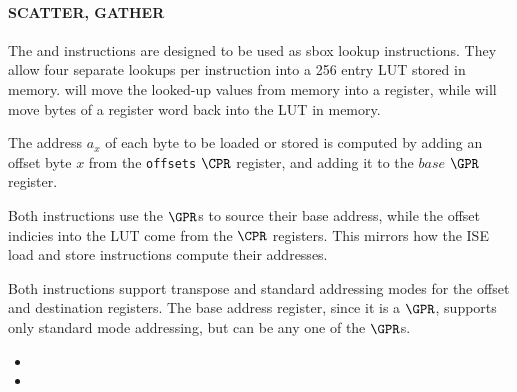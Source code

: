 
\paragraph{SCATTER, GATHER}

The  and  instructions are designed to be used as
sbox lookup instructions. They allow four separate lookups per instruction
into a 256 entry LUT stored in memory.  will move the looked-up
values from memory into a register, while  will move bytes of a
register word back into the LUT in memory.

The address $a_x$ of each byte to be loaded or stored is computed by
adding an offset byte $x$ from the {\tt offsets} $\CPR$ register, and
adding it to the $base$ $\GPR$ register.

Both instructions use the $\GPR$s to source their base address, while the
offset indicies into the LUT come from the $\CPR$ registers. This mirrors
how the ISE load and store instructions compute their addresses.

Both instructions support transpose and standard addressing modes for the
offset and destination registers. The base address register, since it is
a $\GPR$, supports only standard mode addressing, but can be any one of the
$\GPR$s.

\begin{itemize}
\item {}
\item {}
\end{itemize}

